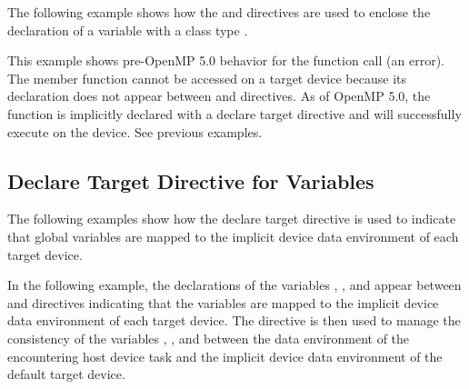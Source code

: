 \begin{cppspecific}

The following example shows how the  and  directives are used to enclose the declaration
of a variable  with a class type . 

This example shows pre-OpenMP 5.0 behavior for the  function call (an error).
The member function  cannot be accessed on a target device because its 
declaration does not appear between  and
 directives. As of OpenMP 5.0, the
function is implicitly declared with a declare target directive 
and will successfully execute on the device.  See previous examples.

\end{cppspecific}

\subsection{Declare Target Directive for Variables}
\label{subsec:declare_target_variables}



The following examples show how the declare target directive is used to indicate that
global variables are mapped to the implicit device data environment of each target device.

In the following example, the declarations of the variables , , and  appear 
between  and 
directives indicating that the variables are mapped to the implicit device data 
environment of each target device. The  directive
is then used to manage the consistency of the variables , , and  between the 
data environment of the encountering host device task and the implicit device data 
environment of the default target device.

